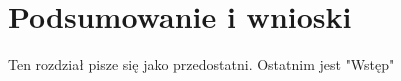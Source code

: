 \chapter[Podsumowanie i wnioski]{Podsumowanie i wnioski}

\label{wnioski}

Ten rozdział pisze się jako przedostatni.
    Ostatnim jest "Wstęp"